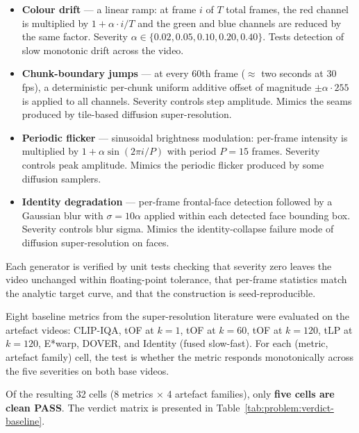 \begin{itemize}
    \item \textbf{Colour drift} --- a linear ramp: at frame $i$ of $T$ total frames, the
          red channel is multiplied by $1 + \alpha \cdot i / T$ and the green and blue
          channels are reduced by the same factor. Severity $\alpha \in \{0.02, 0.05,
          0.10, 0.20, 0.40\}$. Tests detection of slow monotonic drift across the video.
    \item \textbf{Chunk-boundary jumps} --- at every 60th frame ($\approx$ two seconds at
          30 fps), a deterministic per-chunk uniform additive offset of magnitude
          $\pm\alpha \cdot 255$ is applied to all channels. Severity controls step amplitude.
          Mimics the seams produced by tile-based diffusion super-resolution.
    \item \textbf{Periodic flicker} --- sinusoidal brightness modulation: per-frame
          intensity is multiplied by $1 + \alpha \sin(2\pi i / P)$ with period $P = 15$
          frames. Severity controls peak amplitude. Mimics the periodic flicker produced
          by some diffusion samplers.
    \item \textbf{Identity degradation} --- per-frame frontal-face detection followed by a
          Gaussian blur with $\sigma = 10\alpha$ applied within each detected face bounding
          box. Severity controls blur sigma. Mimics the identity-collapse failure mode of
          diffusion super-resolution on faces.
\end{itemize}

Each generator is verified by unit tests checking that severity zero leaves the video
unchanged within floating-point tolerance, that per-frame statistics match the analytic
target curve, and that the construction is seed-reproducible.

Eight baseline metrics from the super-resolution literature were evaluated on the artefact
videos: CLIP-IQA, tOF at $k = 1$, tOF at $k = 60$, tOF at $k = 120$, tLP at $k = 120$,
E*warp, DOVER, and Identity (fused slow-fast). For each (metric, artefact family) cell,
the test is whether the metric responds monotonically across the five severities on both
base videos.

Of the resulting 32 cells (8 metrics $\times$ 4 artefact families), only \textbf{five
cells are clean PASS}. The verdict matrix is presented in
Table~\ref{tab:problem:verdict-baseline}.

